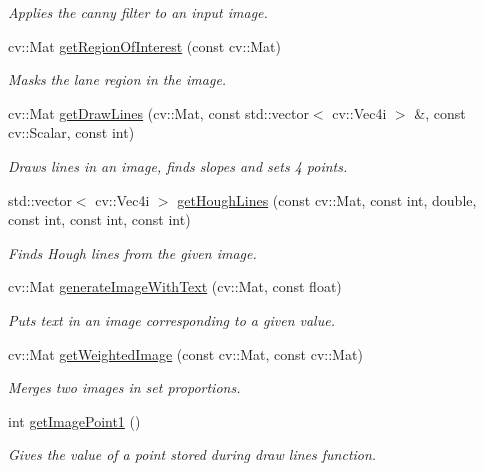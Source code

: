 \begin{DoxyCompactItemize}
\begin{DoxyCompactList}\small\item\em Applies the canny filter to an input image. \end{DoxyCompactList}\item 
cv\+::\+Mat \mbox{\hyperlink{class_image_processing_module_ac408874918516e4bdeab76b0a50437f7}{get\+Region\+Of\+Interest}} (const cv\+::\+Mat)
\begin{DoxyCompactList}\small\item\em Masks the lane region in the image. \end{DoxyCompactList}\item 
cv\+::\+Mat \mbox{\hyperlink{class_image_processing_module_af42931725c6d342227de9cfb1b2b3a90}{get\+Draw\+Lines}} (cv\+::\+Mat, const std\+::vector$<$ cv\+::\+Vec4i $>$ \&, const cv\+::\+Scalar, const int)
\begin{DoxyCompactList}\small\item\em Draws lines in an image, finds slopes and sets 4 points. \end{DoxyCompactList}\item 
std\+::vector$<$ cv\+::\+Vec4i $>$ \mbox{\hyperlink{class_image_processing_module_a2ceaaf4d87e3efc009656f2c0038a7fd}{get\+Hough\+Lines}} (const cv\+::\+Mat, const int, double, const int, const int, const int)
\begin{DoxyCompactList}\small\item\em Finds Hough lines from the given image. \end{DoxyCompactList}\item 
cv\+::\+Mat \mbox{\hyperlink{class_image_processing_module_a516d8bb4833f49eea3385e2efa5f271f}{generate\+Image\+With\+Text}} (cv\+::\+Mat, const float)
\begin{DoxyCompactList}\small\item\em Puts text in an image corresponding to a given value. \end{DoxyCompactList}\item 
cv\+::\+Mat \mbox{\hyperlink{class_image_processing_module_a467d3e826678ec8640996da1e9c19b05}{get\+Weighted\+Image}} (const cv\+::\+Mat, const cv\+::\+Mat)
\begin{DoxyCompactList}\small\item\em Merges two images in set proportions. \end{DoxyCompactList}\item 
int \mbox{\hyperlink{class_image_processing_module_acd9d555ddfe7e9a3262d46f033442504}{get\+Image\+Point1}} ()
\begin{DoxyCompactList}\small\item\em Gives the value of a point stored during draw lines function. \end{DoxyCompactList}\item 

\end{DoxyCompactItemize}
